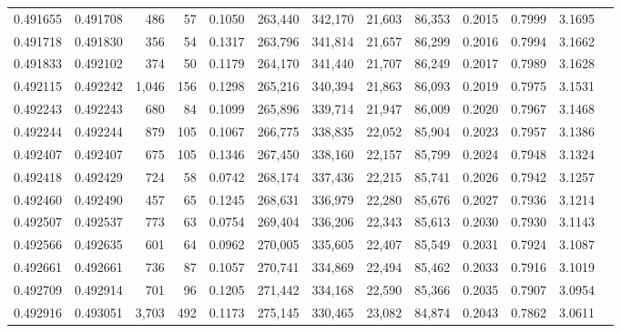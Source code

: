 \begin{tabular}{rrrrrrrrrrrrr}
0.491655 & 0.491708 &   486 &    57 &                                     0.1050 & 263,440 & 342,170 &  21,603 &  86,353 & 0.2015 & 0.7999 & 3.1695 \\
0.491718 & 0.491830 &   356 &    54 &                                     0.1317 & 263,796 & 341,814 &  21,657 &  86,299 & 0.2016 & 0.7994 & 3.1662 \\
0.491833 & 0.492102 &   374 &    50 &                                     0.1179 & 264,170 & 341,440 &  21,707 &  86,249 & 0.2017 & 0.7989 & 3.1628 \\
0.492115 & 0.492242 & 1,046 &   156 &                                     0.1298 & 265,216 & 340,394 &  21,863 &  86,093 & 0.2019 & 0.7975 & 3.1531 \\
0.492243 & 0.492243 &   680 &    84 &                                     0.1099 & 265,896 & 339,714 &  21,947 &  86,009 & 0.2020 & 0.7967 & 3.1468 \\
0.492244 & 0.492244 &   879 &   105 &                                     0.1067 & 266,775 & 338,835 &  22,052 &  85,904 & 0.2023 & 0.7957 & 3.1386 \\
0.492407 & 0.492407 &   675 &   105 &                                     0.1346 & 267,450 & 338,160 &  22,157 &  85,799 & 0.2024 & 0.7948 & 3.1324 \\
0.492418 & 0.492429 &   724 &    58 &                                     0.0742 & 268,174 & 337,436 &  22,215 &  85,741 & 0.2026 & 0.7942 & 3.1257 \\
0.492460 & 0.492490 &   457 &    65 &                                     0.1245 & 268,631 & 336,979 &  22,280 &  85,676 & 0.2027 & 0.7936 & 3.1214 \\
0.492507 & 0.492537 &   773 &    63 &                                     0.0754 & 269,404 & 336,206 &  22,343 &  85,613 & 0.2030 & 0.7930 & 3.1143 \\
0.492566 & 0.492635 &   601 &    64 &                                     0.0962 & 270,005 & 335,605 &  22,407 &  85,549 & 0.2031 & 0.7924 & 3.1087 \\
0.492661 & 0.492661 &   736 &    87 &                                     0.1057 & 270,741 & 334,869 &  22,494 &  85,462 & 0.2033 & 0.7916 & 3.1019 \\
0.492709 & 0.492914 &   701 &    96 &                                     0.1205 & 271,442 & 334,168 &  22,590 &  85,366 & 0.2035 & 0.7907 & 3.0954 \\
0.492916 & 0.493051 & 3,703 &   492 &                                     0.1173 & 275,145 & 330,465 &  23,082 &  84,874 & 0.2043 & 0.7862 & 3.0611 \\

\end{tabular}
